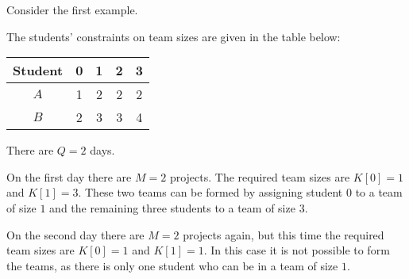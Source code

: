 Consider the first example.

The students' constraints on team sizes are given in the table below:
\begin{tabular}{|c|c|c|c|c|}
\hline
Student & 0 & 1 & 2 & 3 \\
\hline
$A$ & 1 & 2 & 2 & 2 \\
\hline
$B$ & 2 & 3 & 3 & 4\\\hline
\end{tabular}
There are $Q = 2$ days.

On the first day there are $M = 2$ projects. The required team sizes are $K[0] = 1$ and $K[1] = 3$. These two teams can be formed by assigning student $0$ to a team of size $1$ and the remaining three students to a team of size $3$.

On the second day there are $M = 2$ projects again, but this time the required team sizes are $K[0] = 1$ and $K[1] = 1$. In this case it is not possible to form the teams, as there is only one student
who can be in a team of size $1$.